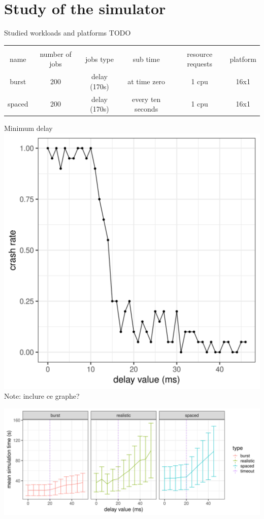 \documentclass[12pt, aspectratio=43]{beamer}
\begin{document}
\section{Study of the simulator}
\begin{frame}{Studied workloads and platforms}
	TODO
	\centering
	\begin{tabular}{|c|c|c|c|c|c|}
		\hline\\
		name & number of jobs & jobs type & sub time & resource requests & platform
		\hline\\
		burst & 200 & delay (170s) & at time zero & 1 cpu & 16x1\\
		spaced & 200 & delay (170s) & every ten seconds & 1 cpu & 16x1\\
		
	\end{tabular}
\end{frame}

\begin{frame}[allowframebreaks]{Minimum delay}
	\centering
	\includegraphics[scale=0.3]{../imgs/min-delay_crash_old.png}\\
	Note: inclure ce graphe?

	\includegraphics[width=\textwidth]{../imgs/min-delay_duration.png}
\end{frame}
\end{document}
